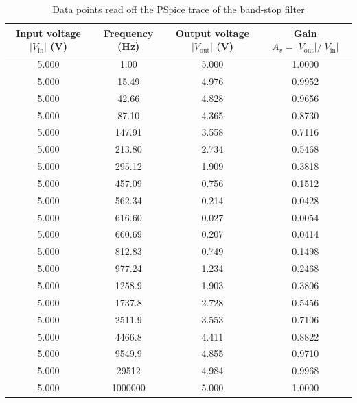 \documentclass[12pt,a4paper]{article}
\begin{document}
	\begin{table}[H]
		\centering
		\caption{Data points read off the PSpice trace of the band-stop filter}
		\label{tab:data4}
		\small
		\renewcommand{\arraystretch}{1.2}
		\begin{tabular}{|c|c|c|c|}
			\hline
			\rowcolor{black!12}\textbf{Input voltage $|V_{\mathrm{in}}|$ (V)} & \textbf{Frequency (Hz)} & \textbf{Output voltage $|V_{\mathrm{out}}|$ (V)} & \textbf{Gain $A_v = |V_{\mathrm{out}}|/|V_{\mathrm{in}}|$} \\
			\hline
			\num{5.000} & \num{1.00} & \num{5.000} & \num{1.0000}\\
			\hline
			\num{5.000} & \num{15.49} & \num{4.976} & \num{0.9952}\\
			\hline
			\num{5.000} & \num{42.66} & \num{4.828} & \num{0.9656}\\
			\hline
			\num{5.000} & \num{87.10} & \num{4.365} & \num{0.8730}\\
			\hline
			\num{5.000} & \num{147.91} & \num{3.558} & \num{0.7116}\\
			\hline
			\num{5.000} & \num{213.80} & \num{2.734} & \num{0.5468}\\
			\hline
			\num{5.000} & \num{295.12} & \num{1.909} & \num{0.3818}\\
			\hline
			\num{5.000} & \num{457.09} & \num{0.756} & \num{0.1512}\\
			\hline
			\num{5.000} & \num{562.34} & \num{0.214} & \num{0.0428}\\
			\hline
			\num{5.000} & \num{616.60} & \num{0.027} & \num{0.0054}\\
			\hline
			\num{5.000} & \num{660.69} & \num{0.207} & \num{0.0414}\\
			\hline
			\num{5.000} & \num{812.83} & \num{0.749} & \num{0.1498}\\
			\hline
			\num{5.000} & \num{977.24} & \num{1.234} & \num{0.2468}\\
			\hline
			\num{5.000} & \num{1258.9} & \num{1.903} & \num{0.3806}\\
			\hline
			\num{5.000} & \num{1737.8} & \num{2.728} & \num{0.5456}\\
			\hline
			\num{5.000} & \num{2511.9} & \num{3.553} & \num{0.7106}\\
			\hline
			\num{5.000} & \num{4466.8} & \num{4.411} & \num{0.8822}\\
			\hline
			\num{5.000} & \num{9549.9} & \num{4.855} & \num{0.9710}\\
			\hline
			\num{5.000} & \num{29512} & \num{4.984} & \num{0.9968}\\
			\hline
			\num{5.000} & \num{1000000} & \num{5.000} & \num{1.0000} \\
			\hline
		\end{tabular}
	\end{table}
\end{document}
